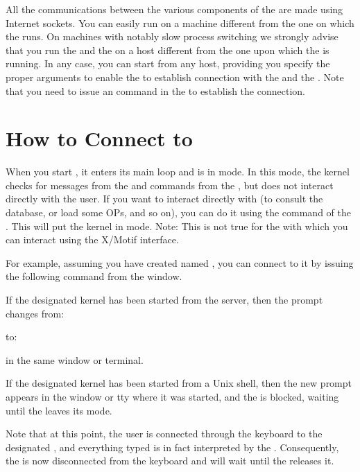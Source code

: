 All the communications between the various components of the \COPRSDE{} are made
using Internet sockets. You can easily
run \aCPK{} on a machine different from the one on which the \OPRSS{}
runs. On machines with notably slow process switching we strongly
advise that you run the \OPRSS{} and the \MPA{} on a host different from the one
upon which the \CPK{} is running. In any case, you can start \aCPK{} from any
host, providing you specify the proper arguments to enable the \CPK{} to
establish connection with the \OPRSS{} and the \MPA{}. Note that you need to
issue an  command in the \OPRSS{} to establish the connection.

\section{How to Connect to \aCPK{}}

When you start \aCPK{}, it enters its main loop and is in  mode. In
this mode, the kernel checks for messages from the \MPA{} and commands from the
\OPRSS{}, but does not interact directly with the user. If you want to
interact directly with \aCPK{} (to consult the database, or load some OPs, and
so on), you can do it using the  command of the \OPRSS{}. This
will put the kernel in  mode. Note: This is not true for the \XPK{}
with which you can interact using the X/Motif interface.

For example, assuming you have created \aCPK{} named , you can
connect to it by issuing the following command from the \OPRSS{} window.


If the designated kernel has been started from the server, then the prompt
changes from:


to:


in the same window or terminal.

If the designated kernel has been started from a Unix shell, then the new prompt
appears in the window or tty where it was started, and the \OPRSS{} is
blocked, waiting until the \CPK{} leaves its  mode.

Note that at this point, the user is connected through the keyboard to the
designated \CPK{}, and everything typed is in fact interpreted by
the \CPK{}. Consequently, the \OPRSS{} is now disconnected from
the keyboard and will wait until the \CPK{} releases it.

